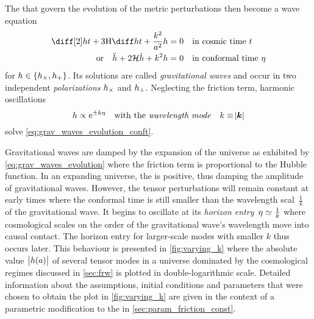 \documentclass[12pt,parskip=half]{scrreprt}
\begin{document}
The  that govern the evolution of the metric perturbations then become a wave equation 
\begin{subequations}\label{eq:grav_waves_evolution}
\begin{align}
	\ddt{h} + 3 \Hcosm \dt{h} + \frac{k^2}{a^2} h &= 0 \quad \text{in cosmic time \(t\)} \\
	\text{or} \quad \ddconf{h} + 2 \Hconf \dconf{h} + k^2 h &= 0 \quad \text{in conformal time \(\conft\)} \label{eq:grav_waves_evolution_conft}
\end{align}
\end{subequations}
for \(h \in \cbr{\hcross, \hplus}\). Its solutions are called \emph{gravitational waves} and occur in two independent \emph{polarizations} \(h_\times\) and \(h_+\). Neglecting the friction term, harmonic oscillations
\begin{equation}
	h \propto \mathrm{e}^{\pm k \eta} \quad \text{with the \emph{wavelength mode}} \quad k \equiv \abs{\boldsymbol{k}}
\end{equation}
solve \eqref{eq:grav_waves_evolution_conft}.

Gravitational waves are damped by the expansion of the universe as exhibited by \eqref{eq:grav_waves_evolution} where the friction term is proportional to the Hubble function. In an expanding universe, the  is positive, thus damping the amplitude of gravitational waves. However, the tensor perturbations will remain constant at early times where the conformal time is still smaller than the wavelength scal~\(\frac{1}{k}\) of the gravitational wave. It begins to oscillate at its \emph{horizon entry}~\(\eta \simeq \frac{1}{k}\) where cosmological scales on the order of the gravitational wave's wavelength move into causal contact. The horizon entry for larger-scale modes with smaller \(k\) thus occurs later. This behaviour is presented in \autoref{fig:varying_k} where the absolute value~\(\abs{h(a)}\) of several tensor modes in a universe dominated by the cosmological regimes discussed in \autoref{sec:frw} is plotted in double-logarithmic scale. Detailed information about the assumptions, initial conditions and parameters that were chosen to obtain the plot in \autoref{fig:varying_k} are given in the context of a parametric modification to the  in \autoref{sec:param_friction_const}.
\end{document}
